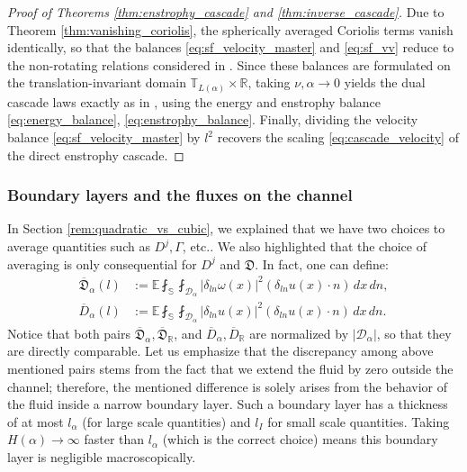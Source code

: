 \documentclass[11pt,a4paper]{article}
\numberwithin{equation}{section}
\numberwithin{theorem}{section}
\numberwithin{remark}{section}
\numberwithin{definition}{section}
\begin{document}
\begin{proof}[Proof of Theorems \ref{thm:enstrophy_cascade} and \ref{thm:inverse_cascade}]
Due to Theorem \ref{thm:vanishing_coriolis}, the spherically averaged Coriolis terms vanish identically, so that the balances \eqref{eq:sf_velocity_master}
and \eqref{eq:sf_vv} reduce to the non-rotating relations considered in
\cite{bed2D}. Since these balances are formulated on the translation-invariant
domain $\mathbb{T}_{L(\alpha)} \times \mathbb{R}$, taking $\nu, \alpha \to 0$ yields the dual cascade laws exactly as in \cite{bed2D}, using the energy and enstrophy balance \eqref{eq:energy_balance}, \eqref{eq:enstrophy_balance}. Finally, dividing the velocity balance \eqref{eq:sf_velocity_master} by $l^2$ recovers the scaling
\eqref{eq:cascade_velocity} of the direct enstrophy cascade.
\end{proof}


\subsubsection{Boundary layers and the fluxes on the channel} \label{sec: boundary layer}
In Section \ref{rem:quadratic_vs_cubic}, we explained that we have two choices to average quantities such as $D^j,\Gamma$, etc.. We also highlighted that the choice of averaging is only consequential for  $D^j$ and $\mathfrak{D}$. In fact, one can define:  
\begin{align}
    \overline{\mathfrak{D}}_{\alpha}(l) &:= \mathbb{E}\fint_{\mathbb{S}}
    \fint_{\mathcal{D}_\alpha} |\delta_{ln}\omega(x)|^2 (\delta_{ln}u(x) \cdot n)
    \, dx \, dn, \label{def:D_vorticity_phys}\\
    \overline{D}_{\alpha}(l) &:= \mathbb{E}\fint_{\mathbb{S}} \fint_{\mathcal{D}_\alpha}
    |\delta_{ln}u(x)|^2 (\delta_{ln}u(x) \cdot n) \, dx \, dn.
    \label{def:D_velocity_phys}
\end{align}
Notice that both pairs $\overline{\mathfrak{D}}_{\alpha}, \overline{\mathfrak{D}}_{\mathbb{R}}$, and $\overline{D}_{\alpha}, \overline{D}_{\mathbb{R}}$ are normalized by $|\mathcal{D}_\alpha|$, so that they are directly
comparable. Let us emphasize that the discrepancy among above mentioned pairs stems from the fact that we extend the fluid by zero outside the channel; therefore, the mentioned difference is solely arises from the behavior of the fluid inside a narrow boundary layer. Such a boundary layer has a thickness of at most $l_{\alpha}$ (for large scale quantities) and $l_{I}$ for small scale quantities. Taking $H(\alpha) \to \infty$ faster than $l_{\alpha}$ (which is the correct choice) means this boundary layer is negligible macroscopically. 
\end{document}
